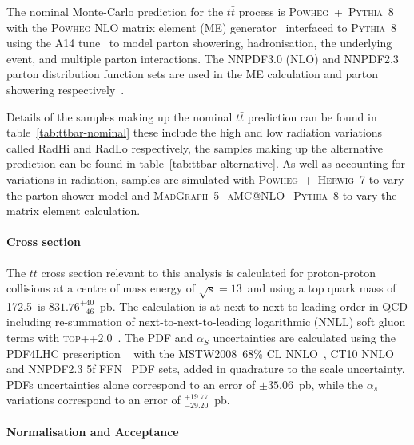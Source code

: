 The nominal Monte-Carlo prediction for the $t\bar{t}$ process is
\textsc{Powheg}~+~\textsc{Pythia}~8 with the \textsc{Powheg} NLO matrix element
(ME) generator~\cite{JHEP0709.2007.126,JHEP0411.2004.040} interfaced to
\textsc{Pythia}~8~\cite{Comp.Phys.Comm.191.159} using the A14
tune~\cite{ATL-PHYS-PUB-2014-021} to model parton showering, hadronisation,
the underlying event, and multiple parton interactions. The NNPDF3.0 (NLO) and
NNPDF2.3 parton distribution function sets are used in the ME calculation and
parton showering respectively~\cite{ATL-PHYS-PUB-2016-020}.

Details of the samples making up the nominal $t\bar{t}$ prediction can be found
in table~\ref{tab:ttbar-nominal} these include the high and low radiation
variations called  RadHi and RadLo respectively, the samples making up the
alternative prediction can be found in table~\ref{tab:ttbar-alternative}. As
well as accounting for variations in radiation, samples are simulated with
\textsc{Powheg}~+~\textsc{Herwig}~7 to vary the parton shower model and
\textsc{MadGraph}~5\textsc{\_aMC@NLO}+\textsc{Pythia}~8 to vary the matrix
element calculation. 


\paragraph{Cross section}

The $t\bar{t}$ cross section relevant to this analysis is calculated for
proton-proton collisions at a centre of mass energy of $\sqrt{s} = 13$~\TeV and
using a top quark mass of 172.5~\GeV is $831.76^{+40}_{-46}$~pb. The
calculation is  at next-to-next-to leading order in QCD including re-summation
of next-to-next-to-leading logarithmic (NNLL) soft gluon terms with
\textsc{top++2.0}~\cite{Beneke2012695,Cacciari2012612,PhysRevLett.109.132001,NNLOcorr,NNLOcorrNLO,PhysRevLett.110.252004,Czakon:2011xx}.
The PDF and $\alpha_S$ uncertainties are calculated using the PDF4LHC
prescription ~\cite{Botje:2011sn} with the MSTW2008~68\% CL
NNLO~\cite{PDFLHC,alphasunc}, CT10
NNLO~\cite{PhysRevD.82.074024,PhysRevD.89.033009} and NNPDF2.3 5f
FFN~\cite{Ball:2012cx} PDF sets, added in quadrature to the scale uncertainty.
PDFs uncertainties alone correspond to an error of $\pm 35.06$~pb, while
the $\alpha_s$ variations correspond to an error of
$^{+19.77}_{-29.20}$~pb.

\paragraph{Normalisation and Acceptance}

